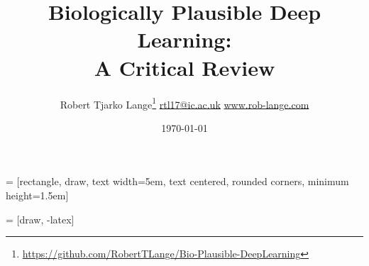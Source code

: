 \documentclass[dvipsnames, usenames]{beamer}
\begin{document}

 = [rectangle, draw, 
    text width=5em, text centered, rounded corners, minimum height=1.5em]
    
 = [draw, -latex]

\title{Biologically Plausible Deep Learning: \\ A Critical Review}
\subtitle{}

\author{\texorpdfstring{Robert Tjarko Lange\thanks{\url{https://github.com/RobertTLange/Bio-Plausible-DeepLearning}}
						\newline\url{rtl17@ic.ac.uk}
						\newline\url{www.rob-lange.com}
	}
	{Author}}


\date{\today}



\begin{frame}[noframenumbering]

\titlepage
\end{frame}
\end{document}
